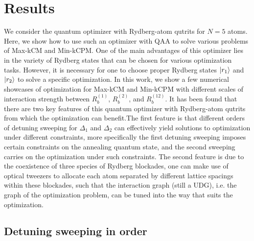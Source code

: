 \documentclass[%
 reprint,
nofootinbib,
 amsmath,amssymb,
 aps,
pra,
floatfix,
]{revtex4-2}
\begin{document}
\section{Results}

We consider the quantum optimizer with Rydberg-atom qutrits for $N = 5$ atoms. Here, we show how to use such an optimizer with QAA to solve various problems of Max-kCM and Min-kCPM. One of the main advantages of this optimizer lies in the variety of Rydberg states that can be chosen for various optimization tasks. However, it is necessary for one to choose proper Rydberg states $\ket{r_1}$ and $\ket{r_2}$ to solve a specific optimization. In this work, we show a few numerical showcases of optimization for Max-kCM and Min-kCPM with different scales of interaction strength between $R^{(1)}_b$, $R^{(2)}_b$, and $R^{(12)}_b$. It has been found that there are two key features of this quantum optimizer with Rydberg-atom qutrits from which the optimization can benefit.The first feature is that different orders of detuning sweeping for $\Delta_1$ and $\Delta_2$ can effectively yield solutions to optimization under different constraints, more specifically the first detuning sweeping imposes certain constraints on the annealing quantum state, and the second sweeping carries on the optimization under such constraints. The second feature is due to the coexistence of three species of Rydberg blockades, one can make use of optical tweezers to allocate each atom separated by different lattice spacings within these blockades, such that the interaction graph (still a UDG), i.e. the graph of the optimization problem, can be tuned into the way that suits the optimization. 

\subsection{Detuning sweeping in order}
\end{document}
